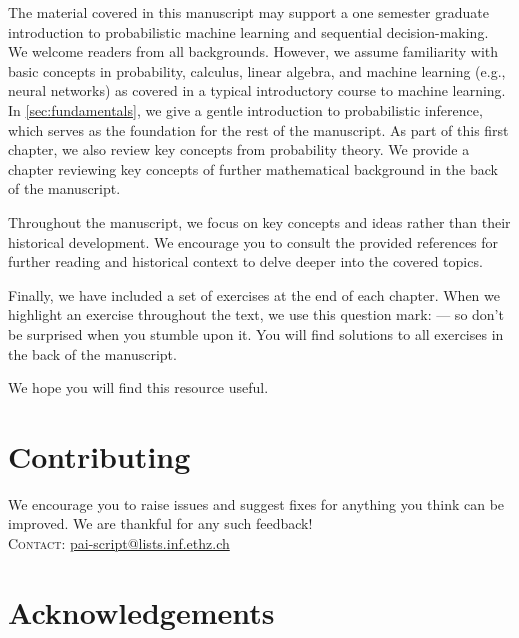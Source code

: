 The material covered in this manuscript may support a one semester graduate introduction to probabilistic machine learning and sequential decision-making.
We welcome readers from all backgrounds.
However, we assume familiarity with basic concepts in probability, calculus, linear algebra, and machine learning (e.g., neural networks) as covered in a typical introductory course to machine learning.
In \cref{sec:fundamentals}, we give a gentle introduction to probabilistic inference, which serves as the foundation for the rest of the manuscript.
As part of this first chapter, we also review key concepts from probability theory.
We provide a chapter reviewing key concepts of further mathematical background in the back of the manuscript.

Throughout the manuscript, we focus on key concepts and ideas rather than their historical development.
We encourage you to consult the provided references for further reading and historical context to delve deeper into the covered topics.


Finally, we have included a set of exercises at the end of each chapter.
When we highlight an exercise throughout the text, we use this question mark:  --- so don't be surprised when you stumble upon it.
You will find solutions to all exercises in the back of the manuscript.

We hope you will find this resource useful.

\section*{Contributing}

We encourage you to raise issues and suggest fixes for anything you think can be improved.
We are thankful for any such feedback! \\
\textsc{Contact:} \href{mailto:pai-script@lists.inf.ethz.ch}{pai-script@lists.inf.ethz.ch}


\section*{Acknowledgements}

